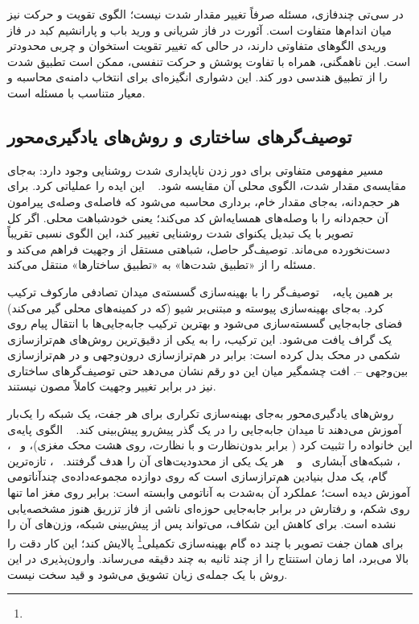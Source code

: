 در سی‌تی چندفازی، مسئله صرفاً تغییر مقدار شدت نیست؛ الگوی تقویت و حرکت نیز میان اندام‌ها متفاوت است. آئورت در فاز شریانی و ورید باب و پارانشیم کبد در فاز وریدی الگوهای متفاوتی دارند، در حالی که تغییر تقویت استخوان و چربی محدودتر است. این ناهمگنی، همراه با تفاوت پوشش و حرکت تنفسی، ممکن است تطبیق شدت را از تطبیق هندسی دور کند. این دشواری انگیزه‌ای برای انتخاب دامنه‌ی محاسبه و معیار متناسب با مسئله است.

\subsection*{توصیف‌گرهای ساختاری و روش‌های یادگیری‌محور}


مسیر مفهومی متفاوتی برای دور زدن ناپایداری شدت روشنایی وجود دارد: به‌جای مقایسه‌ی مقدار شدت، الگوی محلی آن مقایسه شود. ~\cite{heinrich2012} این ایده را عملیاتی کرد. برای هر حجم‌دانه، به‌جای مقدار خام، برداری محاسبه می‌شود که فاصله‌ی وصله‌ی پیرامون آن حجم‌دانه را با وصله‌های همسایه‌اش کد می‌کند؛ یعنی خودشباهت محلی. اگر کل تصویر با یک تبدیل یکنوای شدت روشنایی تغییر کند، این الگوی نسبی تقریباً دست‌نخورده می‌ماند. توصیف‌گر حاصل، شباهتی مستقل از وجهیت فراهم می‌کند و مسئله را از «تطبیق شدت‌ها» به «تطبیق ساختارها» منتقل می‌کند.

بر همین پایه، ~\cite{heinrich2013} توصیف‌گر  را با بهینه‌سازی گسسته‌ی میدان تصادفی مارکوف ترکیب کرد. به‌جای بهینه‌سازی پیوسته و مبتنی‌بر شیو (که در کمینه‌های محلی گیر می‌کند) فضای جابه‌جایی گسسته‌سازی می‌شود و بهترین ترکیب جابه‌جایی‌ها با انتقال پیام روی یک گراف یافت می‌شود. این ترکیب،  را به یکی از دقیق‌ترین روش‌های هم‌ترازسازی شکمی در محک  بدل کرده است:  برابر  در هم‌ترازسازی درون‌وجهی  و  در هم‌ترازسازی بین‌وجهی --. افت چشمگیر میان این دو رقم نشان می‌دهد حتی توصیف‌گرهای ساختاری نیز در برابر تغییر وجهیت کاملاً مصون نیستند.

روش‌های یادگیری‌محور به‌جای بهینه‌سازی تکراری برای هر جفت، یک شبکه را یک‌بار آموزش می‌دهند تا میدان جابه‌جایی را در یک گذر پیش‌رو پیش‌بینی کند. ~\cite{balakrishnan2019} الگوی پایه‌ی این خانواده را تثبیت کرد ( برابر  بدون‌نظارت و  با نظارت، روی هشت محک مغزی)، و ~\cite{chen2022}، ~\cite{mok2020}، شبکه‌های آبشاری~\cite{zhao2019} و ~\cite{hoopes2021} هر یک یکی از محدودیت‌های آن را هدف گرفتند. ~\cite{tian2023}، تازه‌ترین گام، یک مدل بنیادین هم‌ترازسازی است که روی دوازده مجموعه‌داده‌ی چندآناتومی آموزش دیده است؛ عملکرد آن به‌شدت به آناتومی وابسته است:  برابر  روی مغز اما تنها  روی شکم، و رفتارش در برابر جابه‌جایی حوزه‌ای ناشی از فاز تزریق هنوز مشخصه‌یابی نشده است. برای کاهش این شکاف،  می‌تواند پس از پیش‌بینی شبکه، وزن‌های آن را برای همان جفت تصویر با چند ده گام بهینه‌سازی تکمیلی\footnote{} پالایش کند؛ این کار دقت را بالا می‌برد، اما زمان استنتاج را از چند ثانیه به چند دقیقه می‌رساند. وارون‌پذیری در این روش با یک جمله‌ی زیان تشویق می‌شود و قید سخت نیست.

